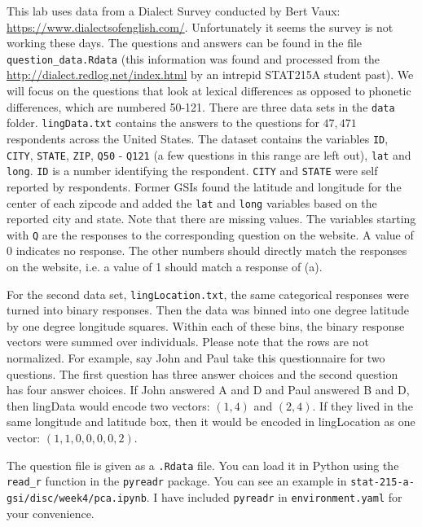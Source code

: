 \documentclass[letterpaper,12pt]{article}
\begin{document}
This lab uses data from a Dialect Survey conducted by Bert Vaux: \url{https://www.dialectsofenglish.com/}. Unfortunately it seems the survey is not working these days. The questions and answers can be found in the file \texttt{question\_data.Rdata} (this information was found and processed from the \url{http://dialect.redlog.net/index.html} by an intrepid STAT215A student past). We will focus on the questions that look at lexical differences as opposed to phonetic differences, which are numbered 50-121. There are three data sets in the \texttt{data} folder. \texttt{lingData.txt} contains the answers to the questions for $47,471$ respondents across the United States. The dataset contains the variables \texttt{ID}, \texttt{CITY}, \texttt{STATE}, \texttt{ZIP}, \texttt{Q50} - \texttt{Q121} (a few questions in this range are left out), \texttt{lat} and \texttt{long}. \texttt{ID} is a number identifying the respondent. \texttt{CITY} and \texttt{STATE} were self reported by respondents. Former GSIs found the latitude and longitude for the center of each zipcode and added the \texttt{lat} and \texttt{long} variables based on the reported city and state. Note that there are missing values. The variables starting with \texttt{Q} are the responses to the corresponding question on the website. A value of 0 indicates no response. The other numbers should directly match the responses on the website, i.e. a value of 1 should match a response of (a).

For the second data set, \texttt{lingLocation.txt}, the same categorical responses were turned into binary responses. Then the data was binned into one degree latitude by one degree longitude squares. Within each of these bins, the binary response vectors were summed over individuals. Please note that the rows are not normalized. For example, say John and Paul take this questionnaire for two questions. The first question has three answer choices and the second question has four answer choices. If John answered A and D and Paul answered B and D, then lingData would encode two vectors: $(1, 4)$ and $(2, 4)$. If they lived in the same longitude and latitude box, then it would be encoded in lingLocation as one vector: $(1, 1, 0, 0, 0, 0, 2)$.

The question file is given as a \texttt{.Rdata} file. You can load it in Python using the \texttt{read\_r} function in the \texttt{pyreadr} package. You can see an example in \texttt{stat-215-a-gsi/disc/week4/pca.ipynb}. I have included \texttt{pyreadr} in \texttt{environment.yaml} for your convenience.
\end{document}
